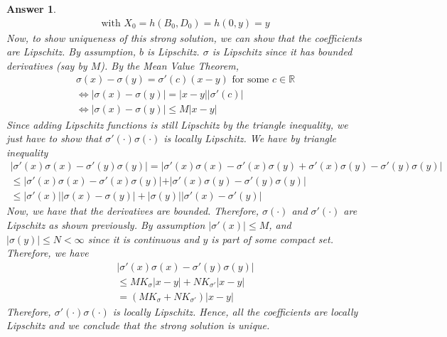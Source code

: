 \documentclass[12pt]{article}
\theoremstyle{colon}
\newtheorem*{answer}{Answer}
\begin{document}
\begin{answer}
\begin{gather*}
    \text{with } X_0 = h(B_0, D_0) = h(0,y) = y
  \end{gather*}
  Now, to show uniqueness of this strong solution, we can show that the coefficients are Lipschitz. By assumption, $b$ is Lipschitz. $\sigma$ is Lipschitz since it has bounded derivatives (say by $M$). By the Mean Value Theorem,
  \begin{gather*}
    \sigma(x) - \sigma(y) = \sigma'(c) (x-y) \text{ for some } c \in \mathbb{R} \\
    \Leftrightarrow \lvert \sigma(x) - \sigma(y) \rvert = \lvert x - y \rvert \lvert \sigma'(c) \rvert \\
    \Leftrightarrow \lvert \sigma(x) - \sigma(y) \rvert \leq M \lvert x - y \rvert
  \end{gather*}
  Since adding Lipschitz functions is still Lipschitz by the triangle inequality, we just have to show that $\sigma'(\cdot) \sigma(\cdot)$ is locally Lipschitz. We have by triangle inequality
  \begin{gather*}
    \lvert \sigma'(x) \sigma(x) - \sigma'(y) \sigma(y) \rvert = \lvert \sigma'(x) \sigma(x) - \sigma'(x) \sigma(y) + \sigma'(x) \sigma(y) - \sigma'(y) \sigma(y) \rvert \\
    \leq \lvert \sigma'(x) \sigma(x) - \sigma'(x) \sigma(y) \lvert + \rvert \sigma'(x) \sigma(y) - \sigma'(y) \sigma(y) \rvert \\
    \leq \lvert \sigma'(x) \rvert \lvert \sigma(x) - \sigma(y) \rvert + \lvert \sigma(y) \rvert \lvert \sigma'(x) - \sigma'(y) \rvert
  \end{gather*}
  Now, we have that the derivatives are bounded. Therefore, $\sigma(\cdot)$ and $\sigma'(\cdot)$ are Lipschitz as shown previously. By assumption $\lvert \sigma'(x) \rvert \leq M$, and $\lvert \sigma(y) \rvert \leq N < \infty$ since it is continuous and $y$ is part of some compact set. Therefore, we have
  \begin{gather*}
    \lvert \sigma'(x) \sigma(x) - \sigma'(y) \sigma(y) \rvert \\
    \leq M K_\sigma \lvert x - y \rvert + N K_{\sigma'} \lvert x - y \rvert \\
    = (M K_\sigma + N K_{\sigma'}) \lvert x - y \rvert
  \end{gather*}
  Therefore, $\sigma'(\cdot) \sigma(\cdot)$ is locally Lipschitz. Hence, all the coefficients are locally Lipschitz and we conclude that the strong solution is unique.
\end{answer}
\end{document}
